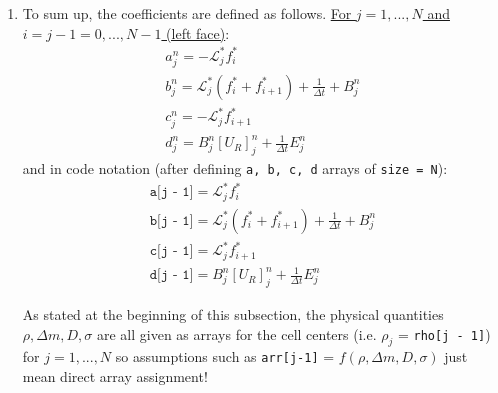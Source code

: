 \documentclass[11pt]{article}
\begin{document}
\begin{enumerate}
    Under the definitions:
    \begin{equation}
      \begin{gathered}
        \mathcal{L}_j^* = \frac{\rho_j^*}{\Delta m_j} \\
        B_j^n = \frac{\chi c \sigma_j^n}{1 + A_j^n}
      \end{gathered}
    \end{equation}
    The numeric arrays are:
    \begin{equation}
      \begin{gathered}
        \texttt{lagrangian\_coeff[j-1]} = \mathcal{L}_j^*\\
        \texttt{total\_coupling[j-1]} = B_j^n
      \end{gathered}
    \end{equation}
    \item To sum up, the coefficients are defined as follows. \newline
    \underline{For $j = 1,...,N$ and $i=j-1=0,...,N-1$ (left face)}:
    \begin{equation}
      \begin{gathered}
        a_{j}^n = -\mathcal{L}_j^* f_i^* \\
        b_{j}^n = \mathcal{L}_j^*(f_i^* + f_{i+1}^*) + \frac{1}{\Delta t} + B_j^n \\
        c_{j}^n = -\mathcal{L}_j^* f_{i+1}^* \\
        d_{j}^n = B_j^n[U_R]_{j}^n + \frac{1}{\Delta t}E_{j}^n
      \end{gathered}
    \end{equation}
    and in code notation (after defining \texttt{a, b, c, d} arrays of \texttt{size = N}):
    \begin{equation}
      \begin{gathered}
        \texttt{a[j - 1]} = \mathcal{L}_j^* f_i^* \\
        \texttt{b[j - 1]} = \mathcal{L}_j^*(f_i^* + f_{i+1}^*) + \frac{1}{\Delta t} + B_j^n \\
        \texttt{c[j - 1]} = \mathcal{L}_j^* f_{i+1}^* \\
        \texttt{d[j - 1]} = B_j^n[U_R]_{j}^n + \frac{1}{\Delta t}E_{j}^n
      \end{gathered}
    \end{equation}
    \begin{notebox}
      As stated at the beginning of this subsection, the physical quantities $\rho, \Delta m, D, \sigma$ are all given as arrays for the cell centers (i.e. $\rho_j$ = \texttt{rho[j - 1]}) for $j = 1,...,N$ so assumptions such as \texttt{arr[j-1]} = $f(\rho, \Delta m, D, \sigma)$ just mean direct array assignment!
    \end{notebox}
  \end{enumerate}
\end{document}

